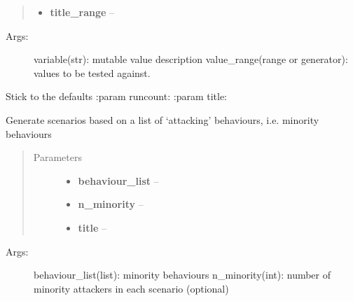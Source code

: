 \documentclass[letterpaper,10pt,english]{sphinxmanual}
\begin{document}
\begin{fulllineitems}
\begin{fulllineitems}
\begin{quote}
\begin{description}
\begin{itemize}
\item {} 
\textbf{title\_range} -- 

\end{itemize}

\end{description}\end{quote}
\begin{description}
\item[{Args:}] \leavevmode
variable(str): mutable value description
value\_range(range or generator): values to be tested against.

\end{description}

\end{fulllineitems}


\begin{fulllineitems}
\label{index:polybos.ExperimentManager.add_default_scenario}
Stick to the defaults
:param runcount:
:param title:

\end{fulllineitems}


\begin{fulllineitems}
\label{index:polybos.ExperimentManager.add_minority_n_behaviour_suite}
Generate scenarios based on a list of `attacking' behaviours, i.e. minority behaviours
\begin{quote}\begin{description}
\item[{Parameters}] \leavevmode\begin{itemize}
\item {} 
\textbf{behaviour\_list} -- 

\item {} 
\textbf{n\_minority} -- 

\item {} 
\textbf{title} -- 

\end{itemize}

\end{description}\end{quote}
\begin{description}
\item[{Args:}] \leavevmode
behaviour\_list(list): minority behaviours
n\_minority(int): number of minority attackers in each scenario (optional)


\end{description}
\end{fulllineitems}
\end{fulllineitems}
\end{document}
